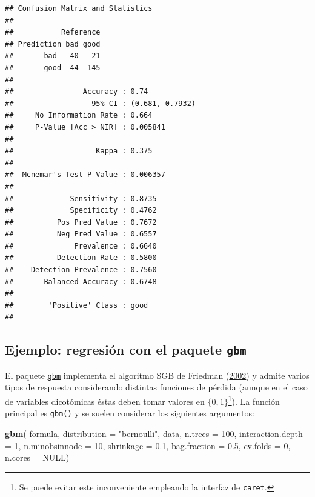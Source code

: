 \documentclass[
  spanish,
]{book}
\newenvironment{Shaded}{\begin{snugshade}}{\end{snugshade}}
\newcommand{\DataTypeTok}[1]{\textcolor[rgb]{0.13,0.29,0.53}{#1}}
\newcommand{\DecValTok}[1]{\textcolor[rgb]{0.00,0.00,0.81}{#1}}
\newcommand{\FloatTok}[1]{\textcolor[rgb]{0.00,0.00,0.81}{#1}}
\newcommand{\KeywordTok}[1]{\textcolor[rgb]{0.13,0.29,0.53}{\textbf{#1}}}
\newcommand{\NormalTok}[1]{#1}
\newcommand{\OtherTok}[1]{\textcolor[rgb]{0.56,0.35,0.01}{#1}}
\newcommand{\StringTok}[1]{\textcolor[rgb]{0.31,0.60,0.02}{#1}}
\theoremstyle{break}
\theoremstyle{definition}
\theoremstyle{definition}
\theoremstyle{definition}
\theoremstyle{remark}
\begin{document}
\begin{verbatim}
## Confusion Matrix and Statistics
## 
##           Reference
## Prediction bad good
##       bad   40   21
##       good  44  145
##                                          
##                Accuracy : 0.74           
##                  95% CI : (0.681, 0.7932)
##     No Information Rate : 0.664          
##     P-Value [Acc > NIR] : 0.005841       
##                                          
##                   Kappa : 0.375          
##                                          
##  Mcnemar's Test P-Value : 0.006357       
##                                          
##             Sensitivity : 0.8735         
##             Specificity : 0.4762         
##          Pos Pred Value : 0.7672         
##          Neg Pred Value : 0.6557         
##              Prevalence : 0.6640         
##          Detection Rate : 0.5800         
##    Detection Prevalence : 0.7560         
##       Balanced Accuracy : 0.6748         
##                                          
##        'Positive' Class : good           
## 
\end{verbatim}

\hypertarget{ejemplo-regresiuxf3n-con-el-paquete-gbm}{%
\subsection{\texorpdfstring{Ejemplo: regresión con el paquete \texttt{gbm}}{Ejemplo: regresión con el paquete gbm}}\label{ejemplo-regresiuxf3n-con-el-paquete-gbm}}

El paquete \href{https://CRAN.R-project.org/package=gbm}{\texttt{gbm}} implementa el algoritmo SGB de Friedman (\protect\hyperlink{ref-friedman2002stochastic}{2002}) y admite varios tipos de respuesta considerando distintas funciones de pérdida (aunque en el caso de variables dicotómicas éstas deben tomar valores en \(\{0, 1\}\)\footnote{Se puede evitar este inconveniente empleando la interfaz de \texttt{caret}.}).
La función principal es \texttt{gbm()} y se suelen considerar los siguientes argumentos:

\begin{Shaded}
\begin{Highlighting}[]
\KeywordTok{gbm}\NormalTok{( formula, }\DataTypeTok{distribution =} \StringTok{"bernoulli"}\NormalTok{, data, }\DataTypeTok{n.trees =} \DecValTok{100}\NormalTok{, }
     \DataTypeTok{interaction.depth =} \DecValTok{1}\NormalTok{, }\DataTypeTok{n.minobsinnode =} \DecValTok{10}\NormalTok{,}
     \DataTypeTok{shrinkage =} \FloatTok{0.1}\NormalTok{, }\DataTypeTok{bag.fraction =} \FloatTok{0.5}\NormalTok{, }
     \DataTypeTok{cv.folds =} \DecValTok{0}\NormalTok{, }\DataTypeTok{n.cores =} \OtherTok{NULL}\NormalTok{)}
\end{Highlighting}
\end{Shaded}
\end{document}
